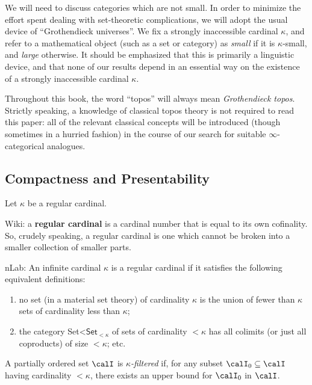 \begin{CategoryTheory}
We will need to discuss categories which are not small. In order to minimize the effort spent dealing with set-theoretic complications, we will adopt the usual device of ``Grothendieck universes''. We fix a strongly inaccessible cardinal $\kappa$, and refer to a mathematical object (such as a set or category) as {\it small} if it is $\kappa$-small, and {\it large} otherwise.
It should be emphasized that this is primarily a linguistic device, and that none of our results depend in an essential way on the existence of a strongly inaccessible cardinal $\kappa$.

Throughout this book, the word ``topos'' will always mean {\em Grothendieck topos}. Strictly speaking, a knowledge of classical topos theory is not required to read this paper: all of the relevant classical concepts will be introduced (though sometimes in a hurried fashion) in the course of our search for suitable $\infty$-categorical analogues. 

\subsection{Compactness and Presentability}

Let $\kappa$ be a regular cardinal.
\begin{shaded}
Wiki: a \textbf{regular cardinal }is a cardinal number that is equal to its own cofinality. So, crudely speaking, a regular cardinal is one which cannot be broken into a smaller collection of smaller parts.

nLab: An infinite cardinal $\kappa$ is a regular cardinal if it satisfies the following equivalent definitions:
\begin{enumerate}\squishlist
\item 
no set (in a material set theory) of cardinality $\kappa$ is the union of fewer than $\kappa$ sets of cardinality less than $\kappa$;
\item the category Set<$\mathsf{Set}_{<\kappa}$ of sets of cardinality $<\kappa$ has all colimits (or just all coproducts) of size $<\kappa$; etc.
\end{enumerate}

\end{shaded}


\begin{definition}
A partially ordered set $\calI$ is {\it $\kappa$-filtered} if, for any subset $\calI_0 \subseteq \calI$ having cardinality $< \kappa$, there exists an upper bound for $\calI_0$ in $\calI$.
\end{definition}


\end{CategoryTheory}
